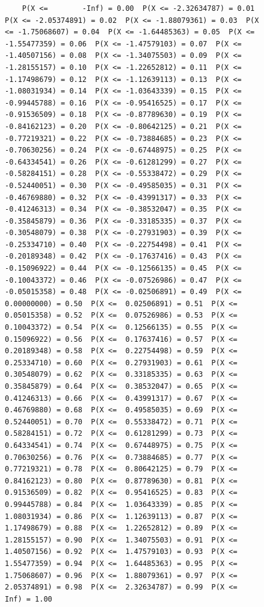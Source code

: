 \documentclass[
  letterpaper,
  DIV=11,
  numbers=noendperiod]{scrartcl}
\theoremstyle{definition}
\theoremstyle{definition}
\theoremstyle{definition}
\theoremstyle{remark}
\begin{document}
\begin{figure}
{\begin{verbatim}
    P(X <=        -Inf) = 0.00  P(X <= -2.32634787) = 0.01  P(X <= -2.05374891) = 0.02  P(X <= -1.88079361) = 0.03  P(X <= -1.75068607) = 0.04  P(X <= -1.64485363) = 0.05  P(X <= -1.55477359) = 0.06  P(X <= -1.47579103) = 0.07  P(X <= -1.40507156) = 0.08  P(X <= -1.34075503) = 0.09  P(X <= -1.28155157) = 0.10  P(X <= -1.22652812) = 0.11  P(X <= -1.17498679) = 0.12  P(X <= -1.12639113) = 0.13  P(X <= -1.08031934) = 0.14  P(X <= -1.03643339) = 0.15  P(X <= -0.99445788) = 0.16  P(X <= -0.95416525) = 0.17  P(X <= -0.91536509) = 0.18  P(X <= -0.87789630) = 0.19  P(X <= -0.84162123) = 0.20  P(X <= -0.80642125) = 0.21  P(X <= -0.77219321) = 0.22  P(X <= -0.73884685) = 0.23  P(X <= -0.70630256) = 0.24  P(X <= -0.67448975) = 0.25  P(X <= -0.64334541) = 0.26  P(X <= -0.61281299) = 0.27  P(X <= -0.58284151) = 0.28  P(X <= -0.55338472) = 0.29  P(X <= -0.52440051) = 0.30  P(X <= -0.49585035) = 0.31  P(X <= -0.46769880) = 0.32  P(X <= -0.43991317) = 0.33  P(X <= -0.41246313) = 0.34  P(X <= -0.38532047) = 0.35  P(X <= -0.35845879) = 0.36  P(X <= -0.33185335) = 0.37  P(X <= -0.30548079) = 0.38  P(X <= -0.27931903) = 0.39  P(X <= -0.25334710) = 0.40  P(X <= -0.22754498) = 0.41  P(X <= -0.20189348) = 0.42  P(X <= -0.17637416) = 0.43  P(X <= -0.15096922) = 0.44  P(X <= -0.12566135) = 0.45  P(X <= -0.10043372) = 0.46  P(X <= -0.07526986) = 0.47  P(X <= -0.05015358) = 0.48  P(X <= -0.02506891) = 0.49  P(X <=  0.00000000) = 0.50  P(X <=  0.02506891) = 0.51  P(X <=  0.05015358) = 0.52  P(X <=  0.07526986) = 0.53  P(X <=  0.10043372) = 0.54  P(X <=  0.12566135) = 0.55  P(X <=  0.15096922) = 0.56  P(X <=  0.17637416) = 0.57  P(X <=  0.20189348) = 0.58  P(X <=  0.22754498) = 0.59  P(X <=  0.25334710) = 0.60  P(X <=  0.27931903) = 0.61  P(X <=  0.30548079) = 0.62  P(X <=  0.33185335) = 0.63  P(X <=  0.35845879) = 0.64  P(X <=  0.38532047) = 0.65  P(X <=  0.41246313) = 0.66  P(X <=  0.43991317) = 0.67  P(X <=  0.46769880) = 0.68  P(X <=  0.49585035) = 0.69  P(X <=  0.52440051) = 0.70  P(X <=  0.55338472) = 0.71  P(X <=  0.58284151) = 0.72  P(X <=  0.61281299) = 0.73  P(X <=  0.64334541) = 0.74  P(X <=  0.67448975) = 0.75  P(X <=  0.70630256) = 0.76  P(X <=  0.73884685) = 0.77  P(X <=  0.77219321) = 0.78  P(X <=  0.80642125) = 0.79  P(X <=  0.84162123) = 0.80  P(X <=  0.87789630) = 0.81  P(X <=  0.91536509) = 0.82  P(X <=  0.95416525) = 0.83  P(X <=  0.99445788) = 0.84  P(X <=  1.03643339) = 0.85  P(X <=  1.08031934) = 0.86  P(X <=  1.12639113) = 0.87  P(X <=  1.17498679) = 0.88  P(X <=  1.22652812) = 0.89  P(X <=  1.28155157) = 0.90  P(X <=  1.34075503) = 0.91  P(X <=  1.40507156) = 0.92  P(X <=  1.47579103) = 0.93  P(X <=  1.55477359) = 0.94  P(X <=  1.64485363) = 0.95  P(X <=  1.75068607) = 0.96  P(X <=  1.88079361) = 0.97  P(X <=  2.05374891) = 0.98  P(X <=  2.32634787) = 0.99  P(X <=         Inf) = 1.00
\end{verbatim}

}
\end{figure}
\end{document}

